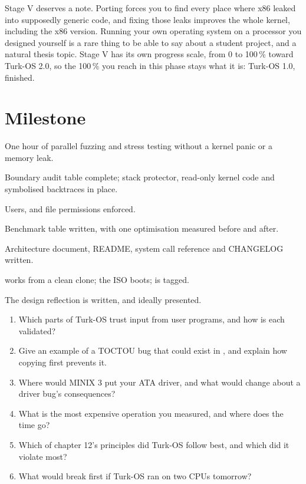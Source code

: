 \documentclass[11pt,a4paper]{article}
\begin{document}
Stage V deserves a note. Porting forces you to find every place where x86 leaked into supposedly generic code, and
fixing those leaks improves the whole kernel, including the x86 version. Running your own operating system on a
processor you designed yourself is a rare thing to be able to say about a student project, and a natural thesis
topic. Stage V has its own progress scale, from 0 to 100\,\% toward Turk-OS 2.0, so the 100\,\% you reach in this
phase stays what it is: Turk-OS 1.0, finished.

\section{Milestone}

\begin{milestonebox}[Turk-OS 1.0]
\begin{checklist}
  \item One hour of parallel fuzzing and stress testing without a kernel panic or a memory leak.
  \item Boundary audit table complete; stack protector, read-only kernel code and symbolised backtraces in place.
  \item Users,  and file permissions enforced.
  \item Benchmark table written, with one optimisation measured before and after.
  \item Architecture document, README, system call reference and CHANGELOG written.
  \item {} works from a clean clone; the ISO boots;  is tagged.
  \item The design reflection is written, and ideally presented.
\end{checklist}
\end{milestonebox}

\begin{questionbox}
\begin{enumerate}
  \item Which parts of Turk-OS trust input from user programs, and how is each validated?
  \item Give an example of a TOCTOU bug that could exist in , and explain how copying first prevents it.
  \item Where would MINIX 3 put your ATA driver, and what would change about a driver bug's consequences?
  \item What is the most expensive operation you measured, and where does the time go?
  \item Which of \MOS chapter 12's principles did Turk-OS follow best, and which did it violate most?
  \item What would break first if Turk-OS ran on two CPUs tomorrow?
\end{enumerate}
\end{questionbox}
\end{document}
